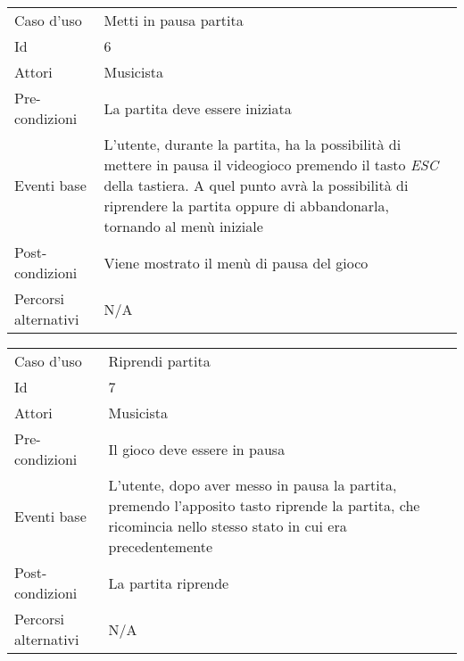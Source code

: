 \begin{center}
                \vspace{2cm}
                \begin{tabular}{ m{10em} | m{20em} }
                    Caso d'uso & Metti in pausa partita \\
                    Id & 6 \\
                    Attori & Musicista \\
                    Pre-condizioni & La partita deve essere iniziata \\
                    Eventi base & L'utente, durante la partita, ha la possibilità di mettere in pausa il videogioco premendo il tasto \emph{ESC} della tastiera. A quel punto avrà la possibilità di riprendere la partita oppure di abbandonarla, tornando al menù iniziale\\
                    Post-condizioni & Viene mostrato il menù di pausa del gioco
                    \\
                    Percorsi alternativi & N/A \\
                \end{tabular}
                
                \vspace{1cm}
                \begin{tabular}{ m{10em} | m{20em} }
                    Caso d'uso & Riprendi partita \\
                    Id & 7 \\
                    Attori & Musicista \\
                    Pre-condizioni & Il gioco deve essere in pausa \\
                    Eventi base & L'utente, dopo aver messo in pausa la partita, premendo l'apposito tasto riprende la partita, che ricomincia nello stesso stato in cui era precedentemente \\
                    Post-condizioni & La partita riprende
                    \\
                    Percorsi alternativi & N/A \\
                \end{tabular}
                

\end{center}
